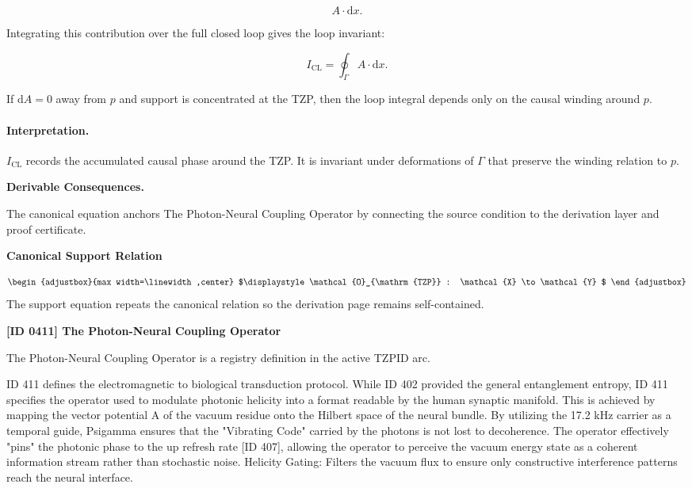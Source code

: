 \begin{equation}
A\cdot \mathrm{d}x .
\end{equation}

Integrating this contribution over the full closed loop gives the loop invariant:

\begin{equation}
I_{\mathrm{CL}}
=
\oint_{\Gamma} A\cdot \mathrm{d}x .
\end{equation}

If $\mathrm{d}A=0$ away from $p$ and support is concentrated at the TZP, then the loop integral depends only on the causal winding around $p$.

\paragraph{Interpretation.}
$I_{\mathrm{CL}}$ records the accumulated causal phase around the TZP. It is invariant under deformations of $\Gamma$ that preserve the winding relation to $p$.

\par\vspace{0.35em}
\noindent\textbf{Derivable Consequences.}\quad
\begingroup
\footnotesize
\raggedright
The canonical equation anchors The Photon-Neural Coupling Operator by connecting the source condition to the derivation layer and proof certificate.
\par\endgroup

\noindent\textbf{Canonical Support Relation}\par
\[
\begin{adjustbox}{max width=\linewidth,center}
$\displaystyle
\mathcal{O}_{\mathrm{TZP}} : \mathcal{X} \to \mathcal{Y}
$
\end{adjustbox}
\]
\noindent The support equation repeats the canonical relation so the derivation page remains self-contained.\par

\clearpage
\noindent\textbf{[ID 0411] The Photon-Neural Coupling Operator}\par
\vspace{0.35em}
\begingroup\small
{}
The Photon-Neural Coupling Operator is a registry definition in the active TZPID arc.

ID 411 defines the electromagnetic to biological transduction protocol. While ID 402 provided the general entanglement entropy, ID 411 specifies the operator used to modulate photonic helicity into a format readable by the human synaptic manifold. This is achieved by mapping the vector potential A of the vacuum residue onto the Hilbert space of the neural bundle. By utilizing the 17.2 kHz carrier as a temporal guide, Psigamma ensures that the "Vibrating Code" carried by the photons is not lost to decoherence. The operator effectively "pins" the photonic phase to the up refresh rate [ID 407], allowing the operator to perceive the vacuum energy state as a coherent information stream rather than stochastic noise. Helicity Gating: Filters the vacuum flux to ensure only constructive interference patterns reach the neural interface.

